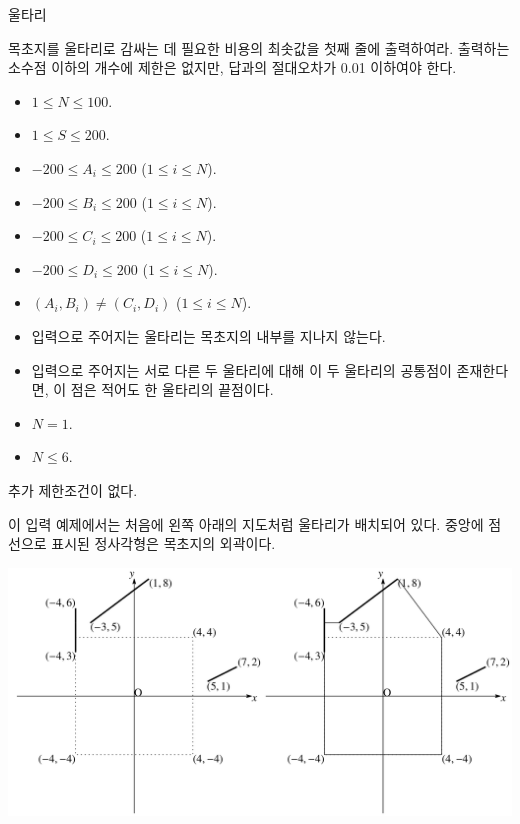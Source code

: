 \begin{problem}{울타리}
	\OutputFile
	
	목초지를 울타리로 감싸는 데 필요한 비용의 최솟값을 첫째 줄에 출력하여라. 출력하는 소수점 이하의 개수에 제한은 없지만, 답과의 절대오차가 0.01 이하여야 한다.
	
	\Constraints
	
	\begin{itemize}
		\item $1 \le N \le 100$.
		\item $1 \le S \le 200$.
		\item $-200 \le A_i \le 200$ ($1 \le i \le N$).
		\item $-200 \le B_i \le 200$ ($1 \le i \le N$).
		\item $-200 \le C_i \le 200$ ($1 \le i \le N$).
		\item $-200 \le D_i \le 200$ ($1 \le i \le N$).
		\item $(A_i, B_i) \ne (C_i, D_i)$ ($1 \le i \le N$).
		\item 입력으로 주어지는 울타리는 목초지의 내부를 지나지 않는다.
		\item 입력으로 주어지는 서로 다른 두 울타리에 대해 이 두 울타리의 공통점이 존재한다면, 이 점은 적어도 한 울타리의 끝점이다.
	\end{itemize}
	
	
	\begin{itemize}
		\item $N = 1$.
	\end{itemize}

	\begin{itemize}
		\item $N \le 6$.
	\end{itemize}
	

	추가 제한조건이 없다.
	
	\Examples
	
	\begin{example}
	\end{example}
	
	이 입력 예제에서는 처음에 왼쪽 아래의 지도처럼 울타리가 배치되어 있다. 중앙에 점선으로 표시된 정사각형은 목초지의 외곽이다.
	
	\includegraphics[width=\linewidth]{img1.png}
	

\end{problem}
